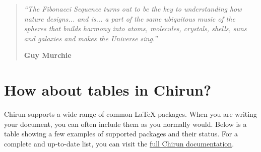 \documentclass{article} %
\begin{document}
\begin{quote}
    \textit{``The Fibonacci Sequence turns out to be the key to understanding how nature designs... and is... a part of the same ubiquitous music of the spheres that builds harmony into atoms, molecules, crystals, shells, suns and galaxies and makes the Universe sing.''}

    \smallskip %
    \textbf{Guy Murchie}
\end{quote}

\section{How about tables in Chirun?}
Chirun supports a wide range of common LaTeX packages. When you are writing your document, you can often include them as you normally would. Below is a table showing a few examples of supported packages and their status. For a complete and up-to-date list, you can visit the \href{https://chirun.org.uk/docs/en/latest/reference/latex/supported_packages.html}{full Chirun documentation}.
\end{document}
